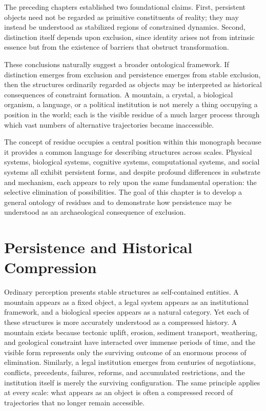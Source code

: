 \documentclass[11pt,oneside]{book}
\theoremstyle{plain}
\theoremstyle{definition}
\theoremstyle{remark}
\begin{document}
The preceding chapters established two foundational claims. First, persistent objects need not be regarded as primitive constituents of reality; they may instead be understood as stabilized regions of constrained dynamics. Second, distinction itself depends upon exclusion, since identity arises not from intrinsic essence but from the existence of barriers that obstruct transformation.

These conclusions naturally suggest a broader ontological framework. If distinction emerges from exclusion and persistence emerges from stable exclusion, then the structures ordinarily regarded as objects may be interpreted as historical consequences of constraint formation. A mountain, a crystal, a biological organism, a language, or a political institution is not merely a thing occupying a position in the world; each is the visible residue of a much larger process through which vast numbers of alternative trajectories became inaccessible.

The concept of residue occupies a central position within this monograph because it provides a common language for describing structures across scales. Physical systems, biological systems, cognitive systems, computational systems, and social systems all exhibit persistent forms, and despite profound differences in substrate and mechanism, each appears to rely upon the same fundamental operation: the selective elimination of possibilities. The goal of this chapter is to develop a general ontology of residues and to demonstrate how persistence may be understood as an archaeological consequence of exclusion.

\section{Persistence and Historical Compression}

Ordinary perception presents stable structures as self-contained entities. A mountain appears as a fixed object, a legal system appears as an institutional framework, and a biological species appears as a natural category. Yet each of these structures is more accurately understood as a compressed history. A mountain exists because tectonic uplift, erosion, sediment transport, weathering, and geological constraint have interacted over immense periods of time, and the visible form represents only the surviving outcome of an enormous process of elimination. Similarly, a legal institution emerges from centuries of negotiations, conflicts, precedents, failures, reforms, and accumulated restrictions, and the institution itself is merely the surviving configuration. The same principle applies at every scale: what appears as an object is often a compressed record of trajectories that no longer remain accessible.
\end{document}
